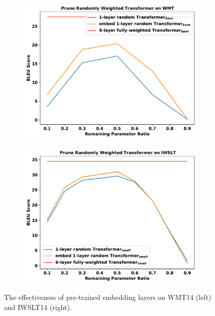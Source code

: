 \begin{figure}
    \centering
    \begin{subfigure}{.4\textwidth}
        \centering
        \includegraphics[width=\textwidth]{fig/wmt_embed.pdf}
    \end{subfigure}%
    \begin{subfigure}{.4\textwidth}
        \centering
        \includegraphics[width=\textwidth]{fig/iwslt_embed.pdf}
    \end{subfigure}
            \vspace{-5pt}
    \caption{The effectiveness of pre-trained embedding layers on WMT14 (left) and IWSLT14 (right).}
    \label{fig:mt_embed}
            \vspace{-10pt}

\end{figure}

